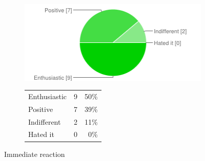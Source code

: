 \documentclass[MSc,paper=a4,pagesize=auto]{icldt}
\begin{document}
\begin{figure}[htbp!]
\centering
\begin{subfigure}{0.4\textwidth}
    \centering
    \includegraphics[width=1\linewidth]{resources/5-immediate_reactino}
\end{subfigure}%
\centering
\begin{subfigure}{\textwidth}
    \centering
   	\begin{tabular}{ l c r }
Enthusiastic&9&50\% \\
Positive&7&39\% \\
Indifferent&2&11\% \\
Hated it&0&0\% \\
\end{tabular}
\end{subfigure} 
    \caption{Immediate reaction}
    \label{fig:5-immediate_reactino}
\end{figure}
\end{document}
